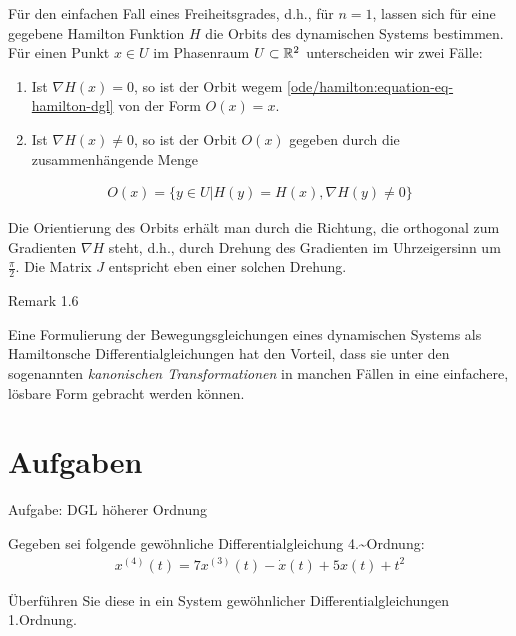 \par
Für den einfachen Fall eines Freiheitsgrades, d.h., für \(n = 1\), lassen sich für eine gegebene Hamilton Funktion \(H\) die Orbits des dynamischen Systems bestimmen.
Für einen Punkt \(x \in U\) im Phasenraum \(U \subset \mathbb{R}^2\) unterscheiden wir zwei Fälle:
\begin{enumerate}

\item {} 
\par
Ist \(\nabla H(x) = 0\), so ist der Orbit wegem \cref{ode/hamilton:equation-eq-hamilton-dgl} von der Form \(O(x) = {x}\).

\item {} 
\par
Ist \(\nabla H(x) \neq 0\), so ist der Orbit \(O(x)\) gegeben durch die zusammenhängende Menge

\end{enumerate}
\begin{align*}
O(x) = \{y \in U | H(y) = H(x), \nabla H(y) \neq 0\}
\end{align*}
\par
Die Orientierung des Orbits erhält man durch die Richtung, die orthogonal zum Gradienten \(\nabla H\) steht, d.h., durch Drehung des Gradienten im Uhrzeigersinn um \(\frac{\pi}{2}\).
Die Matrix \(J\) entspricht eben einer solchen Drehung.
\label{ode/hamilton:remark-6}
\begin{emphBox}{}{}{Remark 1.6}



\par
Eine Formulierung der Bewegungsgleichungen eines dynamischen Systems als Hamiltonsche Differentialgleichungen hat den Vorteil, dass sie unter den sogenannten \emph{kanonischen Transformationen} in manchen Fällen in eine einfachere, lösbare Form gebracht werden können.
\end{emphBox}


\section{Aufgaben}
\label{\detokenize{ode/ex:aufgaben}}\label{\detokenize{ode/ex::doc}}
\begin{emphBox}{}{}{Aufgabe: DGL höherer Ordnung}

\par
Gegeben sei folgende gewöhnliche Differentialgleichung 4.\textasciitilde{}Ordnung:
\begin{align*}
x^{(4)}(t) = 7 x^{(3)}(t) - \dot x(t) + 5 x(t) + t^2
\end{align*}
\par
Überführen Sie diese in ein System gewöhnlicher Differentialgleichungen 1.Ordnung.
\end{emphBox}

